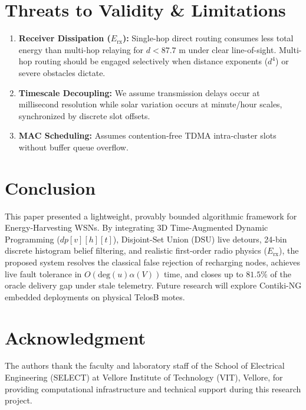 \documentclass[journal]{IEEEtran}
\begin{document}
\section{Threats to Validity \& Limitations}
\begin{enumerate}
    \item \textbf{Receiver Dissipation ($E_{\text{rx}}$):} Single-hop direct routing consumes less total energy than multi-hop relaying for $d < 87.7\text{ m}$ under clear line-of-sight. Multi-hop routing should be engaged selectively when distance exponents ($d^4$) or severe obstacles dictate.
    \item \textbf{Timescale Decoupling:} We assume transmission delays occur at millisecond resolution while solar variation occurs at minute/hour scales, synchronized by discrete slot offsets.
    \item \textbf{MAC Scheduling:} Assumes contention-free TDMA intra-cluster slots without buffer queue overflow.
\end{enumerate}

\section{Conclusion}
This paper presented a lightweight, provably bounded algorithmic framework for Energy-Harvesting WSNs. By integrating 3D Time-Augmented Dynamic Programming ($dp[v][h][t]$), Disjoint-Set Union (DSU) live detours, 24-bin discrete histogram belief filtering, and realistic first-order radio physics ($E_{\text{rx}}$), the proposed system resolves the classical false rejection of recharging nodes, achieves live fault tolerance in $O(\text{deg}(u)\alpha(V))$ time, and closes up to $81.5\%$ of the oracle delivery gap under stale telemetry. Future research will explore Contiki-NG embedded deployments on physical TelosB motes.

\section*{Acknowledgment}
The authors thank the faculty and laboratory staff of the School of Electrical Engineering (SELECT) at Vellore Institute of Technology (VIT), Vellore, for providing computational infrastructure and technical support during this research project.
\end{document}
